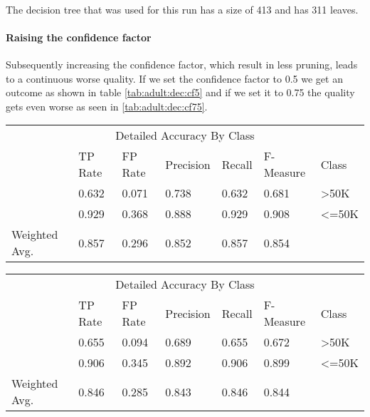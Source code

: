 \documentclass[paper=a4, fontsize=11pt]{scrartcl} %
\numberwithin{equation}{section} %
\numberwithin{figure}{section} %
\numberwithin{table}{section} %
\begin{document}
\paragraph{}The decision tree that was used for this run has a size of 413 and has 311 leaves.

\paragraph{Raising the confidence factor}
Subsequently increasing the confidence factor, which result in less pruning, leads to a continuous worse quality. If we set the confidence factor to 0.5 we get an outcome as shown in table \ref{tab:adult:dec:cf5} and if we set it to 0.75 the quality gets even worse as seen in \ref{tab:adult:dec:cf75}.
\begin{table*}[htb]\centering
    \begin{tabular*}{\columnwidth}{@{}lllllll@{}}
        \toprule 
        \multicolumn{7}{c}{Detailed Accuracy By Class} \\ 
              &  TP Rate & FP Rate & Precision & Recall & F-Measure & Class    \\  \midrule
              &  0.632   & 0.071   & 0.738     & 0.632  & 0.681     & >50K     \\ 
              &  0.929   & 0.368   & 0.888     & 0.929  & 0.908     & <=50K    \\ 
Weighted Avg. &  0.857   & 0.296   & 0.852     & 0.857  & 0.854     &          \\  \bottomrule
    \end{tabular*}
\caption{Decision Tree -- Confidence Factor of 0.5} 
\label{tab:adult:dec:cf5}
\end{table*}
\FloatBarrier


\begin{table*}[htb]\centering
    \begin{tabular*}{\columnwidth}{@{}lllllll@{}}
        \toprule 
        \multicolumn{7}{c}{Detailed Accuracy By Class} \\ 
              &  TP Rate & FP Rate & Precision & Recall &  F-Measure &  Class  \\ \midrule        
              &  0.655   & 0.094   & 0.689     & 0.655  &  0.672     &  >50K   \\          
              &  0.906   & 0.345   & 0.892     & 0.906  &  0.899     &  <=50K  \\          
Weighted Avg. &  0.846   & 0.285   & 0.843     & 0.846  &  0.844     &         \\ \bottomrule          
    \end{tabular*}
\caption{Decision Tree -- Confidence Factor of 0.75} 
\label{tab:adult:dec:cf75}
\end{table*}
\FloatBarrier
\end{document}
